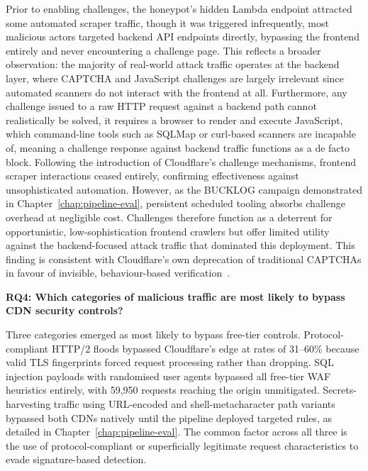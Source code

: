 \documentclass[12pt, a4paper]{report}   %
\begin{document}
Prior to enabling challenges, the honeypot's hidden Lambda endpoint attracted 
some automated scraper traffic, though it was triggered infrequently,  most 
malicious actors targeted backend API endpoints directly, bypassing the frontend 
entirely and never encountering a challenge page. This reflects a broader 
observation: the majority of real-world attack traffic operates at the backend 
layer, where CAPTCHA and JavaScript challenges are largely irrelevant since 
automated scanners do not interact with the frontend at all. Furthermore, any 
challenge issued to a raw HTTP request against a backend path cannot realistically 
be solved, it requires a browser to render and execute JavaScript, which 
command-line tools such as SQLMap or curl-based scanners are incapable of, 
meaning a challenge response against backend traffic functions as a de facto block. 
Following the introduction of Cloudflare's challenge mechanisms, frontend scraper 
interactions ceased entirely, confirming effectiveness against unsophisticated 
automation. However, as the BUCKLOG campaign demonstrated in 
Chapter~\ref{chap:pipeline-eval}, persistent scheduled tooling absorbs challenge 
overhead at negligible cost. Challenges therefore function as a deterrent for 
opportunistic, low-sophistication frontend crawlers but offer limited utility 
against the backend-focused attack traffic that dominated this deployment. This 
finding is consistent with Cloudflare's own deprecation of traditional CAPTCHAs in 
favour of invisible, behaviour-based verification~\cite{cf-captcha-end}.

\textbf{RQ4: Which categories of malicious traffic are most
likely to bypass CDN security controls?}

Three categories emerged as most likely to bypass free-tier
controls. Protocol-compliant HTTP/2 floods bypassed Cloudflare's
edge at rates of 31--60\% because valid TLS fingerprints forced
request processing rather than dropping. SQL injection payloads
with randomised user agents bypassed all free-tier WAF
heuristics entirely, with 59,950 requests reaching the origin
unmitigated. Secrets-harvesting traffic using URL-encoded and
shell-metacharacter path variants bypassed both CDNs natively
until the pipeline deployed targeted rules, as detailed in
Chapter~\ref{chap:pipeline-eval}. The common factor across all
three is the use of protocol-compliant or superficially
legitimate request characteristics to evade signature-based
detection.


\end{document}
